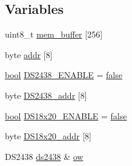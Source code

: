 \subsection*{Variables}
\begin{DoxyCompactItemize}
\item 
uint8\-\_\-t \hyperlink{OWP__DG__1w-adaptor_8ino_a02235b4e96743403348a58d554caa3dc}{mem\-\_\-buffer} \mbox{[}256\mbox{]}
\item 
byte \hyperlink{OWP__DG__1w-adaptor_8ino_a0fc5da2e63a94559429ec9aec32f1831}{addr} \mbox{[}8\mbox{]}
\item 
\hyperlink{stdbool_8h_abb452686968e48b67397da5f97445f5b}{bool} \hyperlink{OWP__DG__1w-adaptor_8ino_ac6c5f6800825a23136e17911f1fe95fc}{D\-S2438\-\_\-\-E\-N\-A\-B\-L\-E} = \hyperlink{stdbool_8h_a65e9886d74aaee76545e83dd09011727}{false}
\item 
byte \hyperlink{OWP__DG__1w-adaptor_8ino_a7adb309e847ab8e7bc2d33c272ae0330}{D\-S2438\-\_\-addr} \mbox{[}8\mbox{]}
\item 
\hyperlink{stdbool_8h_abb452686968e48b67397da5f97445f5b}{bool} \hyperlink{OWP__DG__1w-adaptor_8ino_a868bfbc1df5a872fa1d0ad3e28281840}{D\-S18x20\-\_\-\-E\-N\-A\-B\-L\-E} = \hyperlink{stdbool_8h_a65e9886d74aaee76545e83dd09011727}{false}
\item 
byte \hyperlink{OWP__DG__1w-adaptor_8ino_a3dc83f7f3aaaf79eea4271a94aa6995d}{D\-S18x20\-\_\-addr} \mbox{[}8\mbox{]}
\item 
D\-S2438 \hyperlink{OWH__DS2438__battMon__Test_8ino_ab30c05f5b0dc2426f77bf9e5e1de8508}{ds2438} \& \hyperlink{OWP__DG__1w-adaptor_8ino_a6b4e7e842c912b39dbbaca4973ad2f52}{ow}
\end{DoxyCompactItemize}


